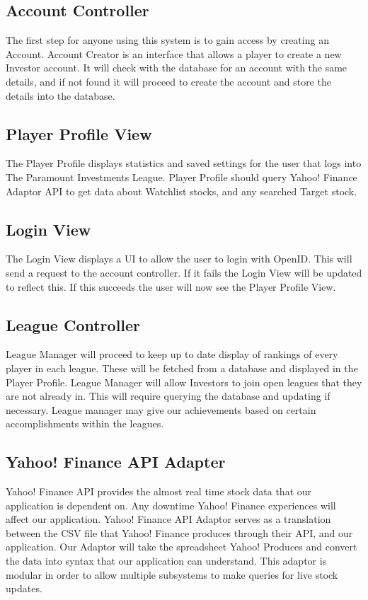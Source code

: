 \subsection{Account Controller}
The first step for anyone using this system is to gain access by creating an Account.
Account Creator is an interface that allows a player to create a new Investor account.
It will check with the database for an account with the same details, and if not found
it will proceed to create the account and store the details into the database.\\

\subsection{Player Profile View}
The Player Profile displays statistics and saved settings for the user that logs
into The Paramount Investments League. Player Profile should query Yahoo! Finance
Adaptor API to get data about Watchlist stocks, and any searched Target stock.\\

\subsection{Login View}
The Login View displays a UI to allow the user to login with OpenID. This will send
a request to the account controller. If it fails the Login View will be updated to
reflect this. If this succeeds the user will now see the Player Profile View.\\

\subsection{League Controller}
League Manager will proceed to keep up to date display of rankings of every
player in each league. These will be fetched from a database and displayed
in the Player Profile. League Manager will allow Investors to join open
leagues that they are not already in. This will require querying the
database and updating if necessary. League manager may give our achievements
based on certain accomplishments within the leagues.\\

\subsection{Yahoo! Finance API Adapter}
Yahoo! Finance API provides the almost real time stock data that our
application is dependent on. Any downtime Yahoo! Finance experiences
will affect our application. Yahoo! Finance API Adaptor serves as a
translation between the CSV file that Yahoo! Finance produces through
their API, and our application. Our Adaptor will take the spreadsheet
Yahoo! Produces and convert the data into syntax that our application
can understand. This adaptor is modular in order to allow multiple
subsystems to make queries for live stock updates.\\

